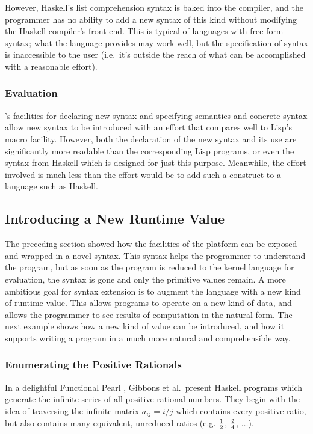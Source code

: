 However, Haskell's list comprehension syntax is baked into the compiler, and the programmer has no ability to add a new syntax of this kind without modifying the Haskell compiler's front-end. This is typical of languages with free-form syntax; what the language provides may work well, but the specification of syntax is inaccessible to the user (i.e.~it's outside the reach of what can be accomplished with a reasonable effort). 

\subsubsection{Evaluation}
\Meta's facilities for declaring new syntax and specifying semantics and concrete syntax allow new syntax to be introduced with an effort that compares well to Lisp's macro facility. However, both the declaration of the new syntax and its use are significantly more readable than the corresponding Lisp programs, or even the syntax from Haskell which is designed for just this purpose. Meanwhile, the effort involved is much less than the effort would be to add such a construct to a language such as Haskell.


%
%
\subsection{Introducing a New Runtime Value}
The preceding section showed how the facilities of the platform can be exposed and wrapped in a novel syntax. This syntax helps the programmer to understand the program, but as soon as the program is reduced to the kernel language for evaluation, the syntax is gone and only the primitive values remain. A more ambitious goal for syntax extension is to augment the language with a new kind of runtime value. This allows programs to operate on a new kind of data, and allows the programmer to see results of computation in the natural form. The next example shows how a new kind of value can be introduced, and how it supports writing a program in a much more natural and comprehensible way.

\subsubsection{Enumerating the Positive Rationals}
In a delightful Functional Pearl \cite{gibbons}, Gibbons et al.\ present Haskell programs which generate the infinite series of all positive rational numbers. They begin with the idea of traversing the infinite matrix $a_{ij} = i/j$ which contains every positive ratio, but also contains many equivalent, unreduced ratios (e.g. $\nicefrac{1}{2}$, $\nicefrac{2}{4}$, $\dots$).

